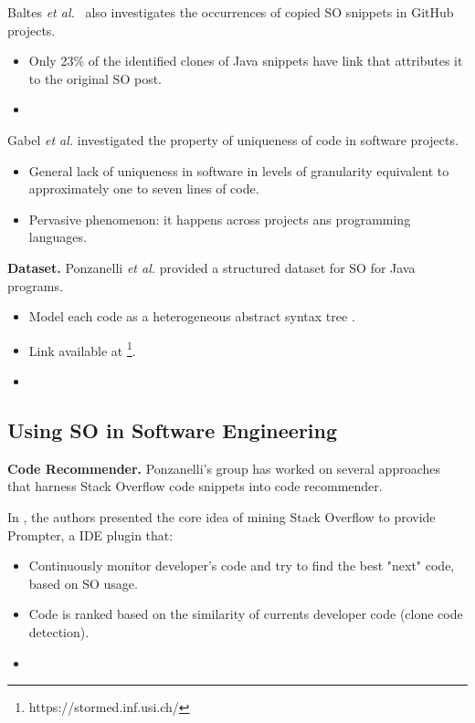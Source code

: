Baltes \textit{et al.}~\cite{Baltes:2017_AttributionRequired} also investigates the occurrences of copied SO snippets in GitHub projects.
\begin{itemize}
	\item Only 23\% of the identified clones of Java snippets have link that attributes it to the original SO post.
    \item 
\end{itemize}

% 
Gabel \textit{et al.} \cite{Gabel:2010_UniquenessOfCode} investigated the property of uniqueness of code in software projects.
\begin{itemize}
	\item General lack of uniqueness in software in levels of granularity equivalent to approximately one to seven lines of code.
	\item Pervasive phenomenon: it happens across projects ans programming languages.
\end{itemize}


\textbf{Dataset.} Ponzanelli \textit{et al.} provided a structured dataset for SO \cite{Ponzanelli:2015:STORM_SODataset} for Java programs.
\begin{itemize}
	\item Model each code as a heterogeneous abstract syntax tree .
	\item Link available at \footnote{https://stormed.inf.usi.ch/}.
	\item {}
\end{itemize}

\subsection{Using SO in Software Engineering}

\textbf{Code Recommender.} Ponzanelli's group has worked on several approaches that harness Stack Overflow code snippets into code recommender. 

In \cite{Ponzanelli:2014_MiningSOTurnIDE,Ponzanelli:2014_Prompter}, the authors presented the core idea of mining Stack Overflow to provide Prompter, a IDE plugin that:
\begin{itemize}
	\item Continuously monitor developer's code and try to find the best "next" code, based on SO usage.
    \item Code is ranked based on the similarity of currents developer code (clone code detection).
    \item {}
\end{itemize}

